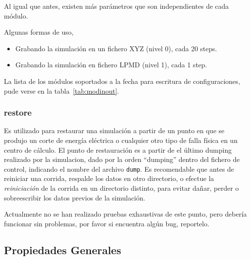 Al igual que antes, existen m\'as par\'ametros que son independientes de cada m\'odulo.

Algunas formas de uso,

\begin{itemize}
 \item Grabando la simulaci\'on en un fichero XYZ (nivel 0), cada 20 steps.
 \item Grabando la simulaci\'on en fichero LPMD (nivel 1), cada 1 step.
\end{itemize}

La lista de los m\'odulos soportados a la fecha para escritura de configuraciones, pude verse en la tabla~\ref{tab:modinout}.



\subsubsection{restore}

Es utilizado para restaurar una simulaci\'on a partir de un punto en que se produjo un corte de energ\'ia el\'ectrica o cualquier otro tipo de falla f\'isica en un centro de c\'alculo. El punto de restauraci\'on es a partir de el \'ultimo dumping realizado por la simulacion, dado por la orden ``dumping'' dentro del fichero de control, indicando el nombre del archivo \verb|dump|. Es recomendable que antes de reiniciar una corrida, respalde los datos en otro directorio, o efectue la \textit{reiniciaci\'on} de la corrida en un directorio distinto, para evitar da\~nar, perder o sobreescribir los datos previos de la simulaci\'on.

Actualmente no se han realizado pruebas exhaustivas de este punto, pero deber\'ia funcionar sin problemas, por favor si encuentra alg\'un bug, reportelo.

\subsection{Propiedades Generales}
